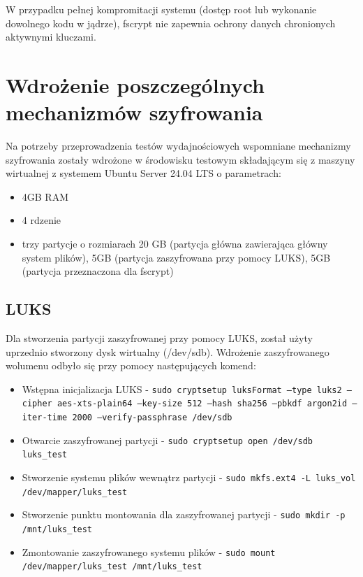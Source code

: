 \documentclass[a4paper]{article}
\begin{document}
W przypadku pełnej kompromitacji systemu (dostęp root lub wykonanie dowolnego kodu w jądrze),
fscrypt nie zapewnia ochrony danych chronionych aktywnymi kluczami.

\section{Wdrożenie poszczególnych mechanizmów szyfrowania}
Na potrzeby przeprowadzenia testów wydajnościowych wspomniane mechanizmy szyfrowania zostały
wdrożone w środowisku testowym składającym się z maszyny wirtualnej z systemem Ubuntu Server
24.04 LTS o parametrach:
\begin{itemize}
    \item 4GB RAM
    \item 4 rdzenie
    \item trzy partycje o rozmiarach 20 GB (partycja główna zawierająca główny system plików),
    5GB (partycja zaszyfrowana przy pomocy LUKS), 5GB (partycja przeznaczona dla fscrypt)
\end{itemize}

\subsection{LUKS}
Dla stworzenia partycji zaszyfrowanej przy pomocy LUKS, został użyty uprzednio stworzony dysk
wirtualny (/dev/sdb). Wdrożenie zaszyfrowanego wolumenu odbyło się przy pomocy następujących komend:
\begin{itemize}
    \item Wstępna inicjalizacja LUKS - \texttt{sudo cryptsetup luksFormat --type luks2 --cipher
    aes-xts-plain64 --key-size 512 --hash sha256 --pbkdf argon2id --iter-time 2000
    --verify-passphrase /dev/sdb}
    \item Otwarcie zaszyfrowanej partycji - \texttt{sudo cryptsetup open /dev/sdb luks\_test}
    \item Stworzenie systemu plików wewnątrz partycji - \texttt{sudo mkfs.ext4 -L luks\_vol
    /dev/mapper/luks\_test}
    \item Stworzenie punktu montowania dla zaszyfrowanej partycji - \texttt{sudo mkdir -p
    /mnt/luks\_test}
    \item Zmontowanie zaszyfrowanego systemu plików - \texttt{sudo mount /dev/mapper/luks\_test
     /mnt/luks\_test}
\end{itemize}
\end{document}
